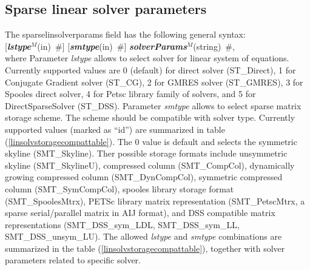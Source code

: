 \documentclass[draft]{article}
\newcommand{\param}[1]{{\em #1}}
\newcommand{\keywordnotype}[1]{\mbox{{\it{\bf{#1}}}}}
\newcommand{\keyword}[2]{\mbox{{\keywordnotype{#1}\tiny (#2)}}}
\newcommand{\field}[2]{\mbox{\keyword{#1}{#2}~\#}}
\newcommand{\optField}[2]{\mbox{[\field{#1}{#2}]}}
\begin{document}
\subsection{Sparse linear solver parameters}
\label{sparselinsolver}
The sparselinsolverparams field has the following general syntax:\\
\optField{lstype$^M$}{in} \optField{smtype}{in} \field{solverParams$^M$}{string},\\
where 
Parameter \param{lstype} allows to select solver for linear system of
equations. Currently supported values are 0 (default) for direct solver
(ST\_Direct), 1 for Conjugate Gradient solver (ST\_CG), 2 for
GMRES solver (ST\_GMRES), 3 for Spooles direct solver, 4 for Petsc
library family of solvers, and 5 for DirectSparseSolver (ST\_DSS).
Parameter \param{smtype} allows to select sparse matrix storage
scheme. The scheme should be compatible with solver type.
Currently supported values (marked as ``id'') are summarized in table
(\ref{linsolvstoragecompattable}). The 0 value is default and selects
the symmetric skyline (SMT\_Skyline). Ther possible storage formats
include unsymmetric skyline (SMT\_SkylineU), 
compressed column (SMT\_CompCol), dynamically growing compressed
column (SMT\_DynCompCol), symmetric compressed column
(SMT\_SymCompCol), spooles library storage format (SMT\_SpoolesMtrx),
PETSc library matrix representation (SMT\_PetscMtrx, a sparse
serial/parallel matrix in AIJ format), and DSS compatible matrix
representations (SMT\_DSS\_sym\_LDL, SMT\_DSS\_sym\_LL, SMT\_DSS\_unsym\_LU).
The allowed \param{lstype} and \param{smtype} combinations are
summarized in the table (\ref{linsolvstoragecompattable}), together
with solver parameters related to specific solver.
\end{document}
